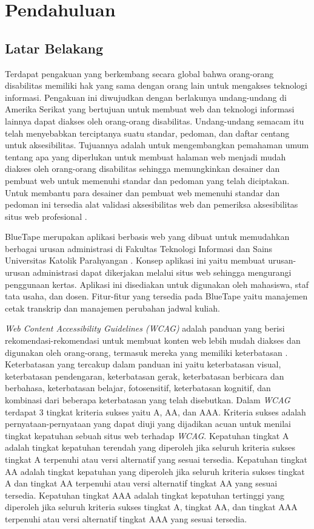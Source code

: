 \chapter{Pendahuluan}
\label{chap:pendahuluan}
   
\section{Latar Belakang}
\label{sec:latarbelakang}
Terdapat pengakuan yang berkembang secara global bahwa orang-orang disabilitas memiliki hak yang sama dengan orang lain untuk mengakses teknologi informasi. Pengakuan ini diwujudkan dengan berlakunya undang-undang di Amerika Serikat yang bertujuan untuk membuat web dan teknologi informasi lainnya dapat diakses oleh orang-orang disabilitas. Undang-undang semacam itu telah menyebabkan terciptanya suatu standar, pedoman, dan daftar centang untuk aksesibilitas. Tujuannya adalah untuk mengembangkan pemahaman umum tentang apa yang diperlukan untuk membuat halaman web menjadi mudah diakses oleh orang-orang disabilitas sehingga memungkinkan desainer dan pembuat web untuk memenuhi standar dan pedoman yang telah diciptakan. Untuk membantu para desainer dan pembuat web memenuhi standar dan pedoman ini tersedia alat validasi aksesibilitas web dan pemeriksa aksesibilitas situs web profesional \cite{WebAccessibility-ABroderView}.

BlueTape merupakan aplikasi berbasis web yang dibuat untuk memudahkan berbagai urusan administrasi di Fakultas Teknologi Informasi dan Sains Universitas Katolik Parahyangan \cite{BlueTape}. Konsep aplikasi ini yaitu membuat urusan-urusan administrasi dapat dikerjakan melalui situs web sehingga mengurangi penggunaan kertas. Aplikasi ini disediakan untuk digunakan oleh mahasiswa, staf tata usaha, dan dosen. Fitur-fitur yang tersedia pada BlueTape yaitu manajemen cetak transkrip dan manajemen perubahan jadwal kuliah.

\textit{Web Content Accessibility Guidelines (WCAG)} adalah panduan yang berisi rekomendasi-rekomendasi untuk membuat konten web lebih mudah diakses dan digunakan oleh orang-orang, termasuk mereka yang memiliki keterbatasan \cite{WCAG:2.1}. Keterbatasan yang tercakup dalam panduan ini yaitu keterbatasan visual, keterbatasan pendengaran, keterbatasan gerak, keterbatasan berbicara dan berbahasa, keterbatasan belajar, fotosensitif, keterbatasan kognitif, dan kombinasi dari beberapa keterbatasan yang telah disebutkan. Dalam \textit{WCAG} terdapat 3 tingkat kriteria sukses yaitu A, AA, dan AAA. Kriteria sukses adalah pernyataan-pernyataan yang dapat diuji yang dijadikan acuan untuk menilai tingkat kepatuhan sebuah situs web terhadap \textit{WCAG}. Kepatuhan tingkat A adalah tingkat kepatuhan terendah yang diperoleh jika seluruh kriteria sukses tingkat A terpenuhi atau versi alternatif yang sesuai tersedia. Kepatuhan tingkat AA adalah tingkat kepatuhan yang diperoleh jika seluruh kriteria sukses tingkat A dan tingkat AA terpenuhi atau versi alternatif tingkat AA yang sesuai tersedia. Kepatuhan tingkat AAA adalah tingkat kepatuhan tertinggi yang diperoleh jika seluruh kriteria sukses tingkat A, tingkat AA, dan tingkat AAA terpenuhi atau versi alternatif tingkat AAA yang sesuai tersedia.

